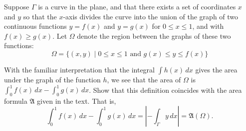 \documentclass[12 pt, letterpaper]{hmcpset}
\begin{document}
\begin{problem}[S \& S \S 4.5 \#3.]
	Suppose $\Gamma$ is a curve in the plane, and that there exists a set of coordinates $x$ and $y$ so that the $x$-axis divides the curve into the union of the graph of two continuous functions $y = f(x)$ and $y = g(x)$ for $0 \le x \le 1$, and with $f(x) \ge g(x)$. Let $\Omega$ denote the region between the graphs of these two functions:
	\[
		\Omega = \{ (x, y) \mid 0 \le x \le 1 \text{ and } g(x) \le y \le f(x) \}
	\]

	With the familiar interpretation that the integral $\int  h(x) \, dx$ gives the area under the graph of the function $h$, we see that the area of $\Omega$ is $\int_{0}^{1} f(x) \, dx - \int_{0}^{1} g(x) \, dx$. Show that this definition coincides with the area formula $\mathfrak{A}$ given in the text. That is,
	\[
		\int_{0}^{1} f(x) \, dx - \int_{0}^{1} g(x) \, dx = \left \lvert - \int_{\Gamma} y \, dx  \right \rvert = \mathfrak{A}(\Omega).
	\]
\end{problem}
\end{document}
